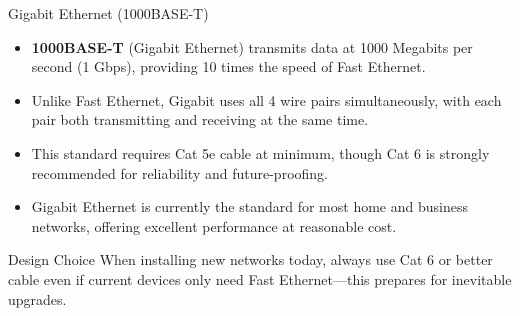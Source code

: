 \documentclass[aspectratio=169]{beamer}
\begin{document}
\begin{frame}{Gigabit Ethernet (1000BASE-T)}
    \begin{itemize}
        \item \textbf{1000BASE-T} (Gigabit Ethernet) transmits data at 1000 Megabits per second (1 Gbps), providing 10 times the speed of Fast Ethernet.
        \item Unlike Fast Ethernet, Gigabit uses all 4 wire pairs simultaneously, with each pair both transmitting and receiving at the same time.
        \item This standard requires Cat 5e cable at minimum, though Cat 6 is strongly recommended for reliability and future-proofing.
        \item Gigabit Ethernet is currently the standard for most home and business networks, offering excellent performance at reasonable cost.
    \end{itemize}
    
    \vspace{0.3cm}
    \begin{block}{Design Choice}
        When installing new networks today, always use Cat 6 or better cable even if current devices only need Fast Ethernet---this prepares for inevitable upgrades.
    \end{block}
\end{frame}
\end{document}
